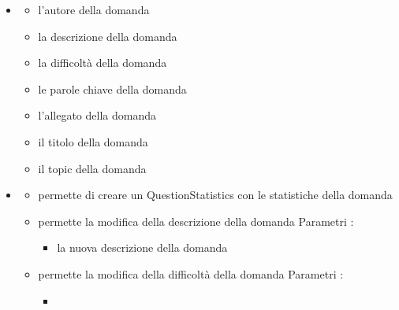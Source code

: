 \begin{itemize}
\item {}
\begin{itemize}
\item {}
\newline
l'autore della domanda
\item {}
\newline
la descrizione della domanda
\item {}
\newline
la difficoltà della domanda
\item {}
\newline
le parole chiave della domanda
\item {}
\newline
l'allegato della domanda
\item {}
\newline
il titolo della domanda
\item {}
\newline
il topic della domanda
\end{itemize}
\item {}
\begin{itemize}
\item {}
\newline
permette di creare un QuestionStatistics con le statistiche della domanda
\newline
\item {}
\newline
permette la modifica della descrizione della domanda
\newline
Parametri :
\begin{itemize}
\item {}
\newline
la nuova descrizione della domanda
\end{itemize}
\item {}
\newline
permette la modifica della difficoltà della domanda
\newline
Parametri :
\begin{itemize}
\item {}

\end{itemize}
\end{itemize}
\end{itemize}
